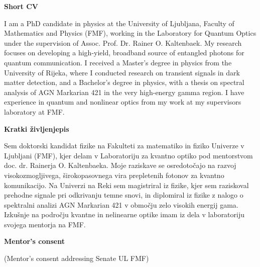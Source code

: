 \documentclass{article}
\theoremstyle{mytheoremstyle}
\theoremstyle{mytheoremstyle}
\theoremstyle{myproblemstyle}
\begin{document}
\begin{center}
	\textbf{Short CV}
\end{center}
I am a PhD candidate in physics at the University of Ljubljana, Faculty of Mathematics and Physics (FMF),
working in the Laboratory for Quantum Optics under the supervision of Assoc. Prof. Dr. Rainer O. Kaltenbaek.
My research focuses on developing a high-yield, broadband source of entangled photons for quantum communication.
I received a Master’s degree in physics from the University of Rijeka,
where I conducted research on transient signals in dark matter detection,
and a Bachelor’s degree in physics, with a thesis on spectral analysis of AGN Markarian 421 in the very high-energy gamma region.
I have experience in quantum and nonlinear optics from my work at my supervisors laboratory at FMF.

\vspace{1cm}

\begin{center}
	\textbf{Kratki življenjepis}
\end{center}
Sem doktorski kandidat fizike na Fakulteti za matematiko in fiziko Univerze v Ljubljani (FMF),
kjer delam v Laboratoriju za kvantno optiko pod mentorstvom doc. dr. Rainerja O. Kaltenbaeka.
Moje raziskave se osredotočajo na razvoj visokozmogljivega, širokopasovnega vira prepletenih fotonov za kvantno komunikacijo.
Na Univerzi na Reki sem magistriral iz fizike, kjer sem raziskoval prehodne signale pri odkrivanju temne snovi,
in diplomiral iz fizike z nalogo o spektralni analizi AGN Markarian 421 v območju zelo visokih energij gama.
Izkušnje na področju kvantne in nelinearne optike imam iz dela v laboratoriju svojega mentorja na FMF.



\clearpage
\pagestyle{plain}

\vspace{1cm}

\begin{center}
	\textbf{Mentor's consent}
\end{center}

\vspace{1cm}

\noindent (Mentor's consent addressing Senate UL FMF)

\end{document}
